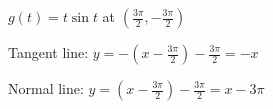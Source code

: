 {$g(t) = t\sin t$ at $\left(\frac{3\pi}{2},-\frac{3\pi}{2}\right)$
}
{Tangent line: $y = -(x-\frac{3\pi}{2}) - \frac{3\pi}{2} = -x$

Normal line: $y = (x-\frac{3\pi}{2}) - \frac{3\pi}{2} = x-3\pi$
}
